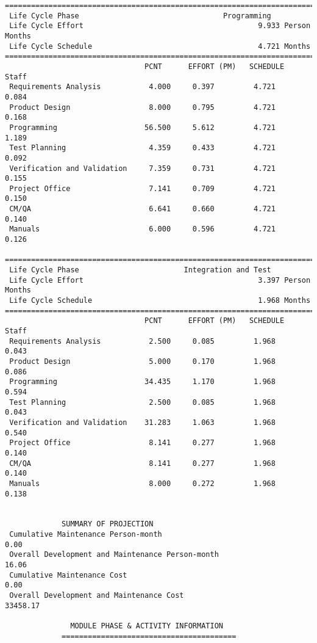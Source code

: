\documentclass[11pt,a4paper,spanish,twoside]{report}
\begin{document}
{\begin{verbatim}
==============================================================================
 Life Cycle Phase                                 Programming
 Life Cycle Effort                                        9.933 Person Months
 Life Cycle Schedule                                      4.721 Months
==============================================================================
                                PCNT      EFFORT (PM)   SCHEDULE       Staff   
 Requirements Analysis           4.000     0.397         4.721        0.084
 Product Design                  8.000     0.795         4.721        0.168
 Programming                    56.500     5.612         4.721        1.189
 Test Planning                   4.359     0.433         4.721        0.092
 Verification and Validation     7.359     0.731         4.721        0.155
 Project Office                  7.141     0.709         4.721        0.150
 CM/QA                           6.641     0.660         4.721        0.140
 Manuals                         6.000     0.596         4.721        0.126

==============================================================================
 Life Cycle Phase                        Integration and Test
 Life Cycle Effort                                        3.397 Person Months
 Life Cycle Schedule                                      1.968 Months
==============================================================================
                                PCNT      EFFORT (PM)   SCHEDULE       Staff   
 Requirements Analysis           2.500     0.085         1.968        0.043
 Product Design                  5.000     0.170         1.968        0.086
 Programming                    34.435     1.170         1.968        0.594
 Test Planning                   2.500     0.085         1.968        0.043
 Verification and Validation    31.283     1.063         1.968        0.540
 Project Office                  8.141     0.277         1.968        0.140
 CM/QA                           8.141     0.277         1.968        0.140
 Manuals                         8.000     0.272         1.968        0.138


             SUMMARY OF PROJECTION
 Cumulative Maintenance Person-month                                 0.00
 Overall Development and Maintenance Person-month                   16.06
 Cumulative Maintenance Cost                                         0.00
 Overall Development and Maintenance Cost                        33458.17

		       MODULE PHASE & ACTIVITY INFORMATION
		     ========================================


\end{verbatim}}
\end{document}
